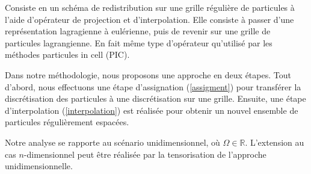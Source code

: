 Consiste en un schéma de redistribution sur une grille régulière de particules à l'aide d'opérateur de projection et d'interpolation. Elle consiste à passer d'une représentation lagragienne à eulérienne, puis de revenir sur une grille de particules lagrangienne. En fait même type d'opérateur qu'utilisé par les méthodes particules in cell (PIC).

Dans notre méthodologie, nous proposons une approche en deux étapes. Tout d'abord, nous effectuons une étape d'assignation (\ref{assigment}) pour transférer la discrétisation des particules à une discrétisation sur une grille. Ensuite, une étape d'interpolation (\ref{interpolation}) est réalisée pour obtenir un nouvel ensemble de particules régulièrement espacées.

Notre analyse se rapporte au scénario unidimensionnel, où $\Omega \in \mathbb{R}$. L'extension au cas $n$-dimensionnel peut être réalisée par la tensorisation de l'approche unidimensionnelle.

